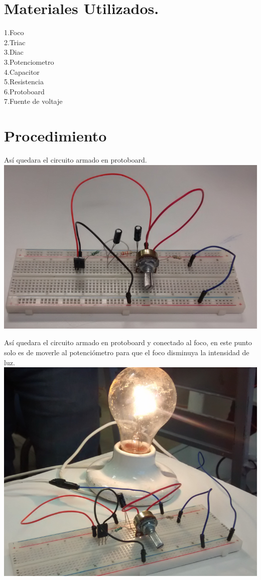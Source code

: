 \documentclass[10pt,a4paper]{article}
\begin{document}
\section{Materiales Utilizados. }
1.Foco\\
2.Triac\\
3.Diac\\
3.Potenciometro \\
4.Capacitor \\
5.Resistencia\\
6.Protoboard\\
7.Fuente de voltaje\\

\section{Procedimiento } 

Así quedara el circuito armado en protoboard.\\
\bigskip 
\centering
\includegraphics[scale=.80]{proto.png}\\
\raggedright
Así quedara el circuito armado en protoboard y conectado al foco, en este punto solo es de moverle al potenciómetro para que el foco disminuya la intensidad de luz.\\
\bigskip
\centering
\includegraphics[scale=.70]{practica.png}\\
\raggedright
\end{document}
